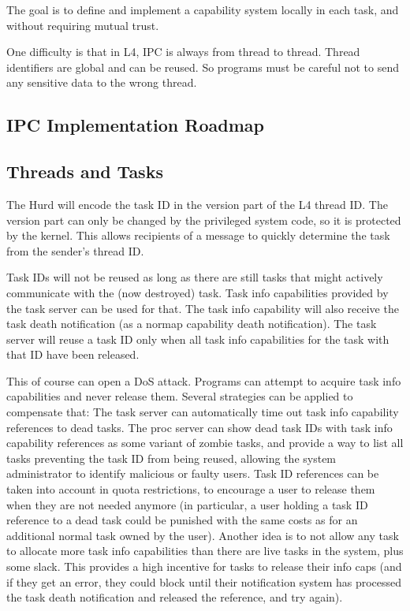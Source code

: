 \documentclass[9pt,a4paper]{extarticle}
\begin{document}
The goal is to define and implement a capability system locally in
each task, and without requiring mutual trust.  

One difficulty is that in L4, IPC is always from thread to thread.
Thread identifiers are global and can be reused.  So programs must be
careful not to send any sensitive data to the wrong thread.

\subsection{IPC Implementation Roadmap}

\subsection{Threads and Tasks}
  
The Hurd will encode the task ID in the version part of the L4 thread
ID.  The version part can only be changed by the privileged system
code, so it is protected by the kernel.  This allows recipients of a
message to quickly determine the task from the sender's thread ID.

Task IDs will not be reused as long as there are still tasks that
might actively communicate with the (now destroyed) task.  Task info
capabilities provided by the task server can be used for that.  The
task info capability will also receive the task death notification (as
a normap capability death notification).  The task server will reuse a
task ID only when all task info capabilities for the task with that ID
have been released.

This of course can open a DoS attack.  Programs can attempt to acquire
task info capabilities and never release them.  Several strategies can
be applied to compensate that: The task server can automatically time
out task info capability references to dead tasks.  The proc server
can show dead task IDs with task info capability references as some
variant of zombie tasks, and provide a way to list all tasks
preventing the task ID from being reused, allowing the system
administrator to identify malicious or faulty users.  Task ID
references can be taken into account in quota restrictions, to
encourage a user to release them when they are not needed anymore (in
particular, a user holding a task ID reference to a dead task could be
punished with the same costs as for an additional normal task owned by
the user).  Another idea is to not allow any task to allocate more
task info capabilities than there are live tasks in the system, plus
some slack.  This provides a high incentive for tasks to release their
info caps (and if they get an error, they could block until their
notification system has processed the task death notification and
released the reference, and try again).
\end{document}
